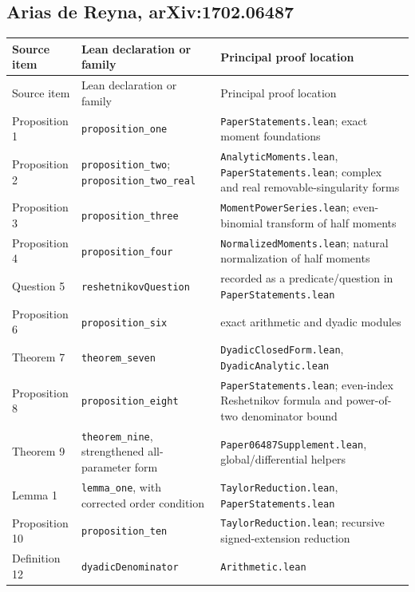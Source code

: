 \documentclass[11pt,oneside]{article}
\theoremstyle{definition}
\theoremstyle{remark}
\begin{document}
\subsection{Arias de Reyna, arXiv:1702.06487}
\begin{longtable}{>{\raggedright\arraybackslash}p{} >{\raggedright\arraybackslash}p{} >{\raggedright\arraybackslash}p{}}
\toprule
Source item & Lean declaration or family & Principal proof location \\
\midrule
\endfirsthead
\toprule
Source item & Lean declaration or family & Principal proof location \\
\midrule
\endhead
Proposition 1 & \nolinkurl{proposition_one} & \nolinkurl{PaperStatements.lean}; exact moment foundations \\
Proposition 2 & \nolinkurl{proposition_two}; \nolinkurl{proposition_two_real} & \nolinkurl{AnalyticMoments.lean}, \nolinkurl{PaperStatements.lean}; complex and real removable-singularity forms \\
Proposition 3 & \nolinkurl{proposition_three} & \nolinkurl{MomentPowerSeries.lean}; even-binomial transform of half moments \\
Proposition 4 & \nolinkurl{proposition_four} & \nolinkurl{NormalizedMoments.lean}; natural normalization of half moments \\
Question 5 & \nolinkurl{reshetnikovQuestion} & recorded as a predicate/question in \nolinkurl{PaperStatements.lean} \\
Proposition 6 & \nolinkurl{proposition_six} & exact arithmetic and dyadic modules \\
Theorem 7 & \nolinkurl{theorem_seven} & \nolinkurl{DyadicClosedForm.lean}, \nolinkurl{DyadicAnalytic.lean} \\
Proposition 8 & \nolinkurl{proposition_eight} & \nolinkurl{PaperStatements.lean}; even-index Reshetnikov formula and power-of-two denominator bound \\
Theorem 9 & \nolinkurl{theorem_nine}, strengthened all-parameter form & \nolinkurl{Paper06487Supplement.lean}, global/differential helpers \\
Lemma 1 & \nolinkurl{lemma_one}, with corrected order condition & \nolinkurl{TaylorReduction.lean}, \nolinkurl{PaperStatements.lean} \\
Proposition 10 & \nolinkurl{proposition_ten} & \nolinkurl{TaylorReduction.lean}; recursive signed-extension reduction \\
Definition 12 & \nolinkurl{dyadicDenominator} & \nolinkurl{Arithmetic.lean} \\

\end{longtable}
\end{document}
